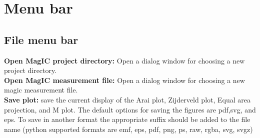 \documentclass[12pt]{article}
\begin{document}
\section{Menu bar}
\subsection{File menu bar}
{\bf Open MagIC project directory:} Open a dialog window for choosing a new project directory.\\
{\bf Open MagIC measurement file:} Open a dialog window for choosing a new magic measurement file.\\
{\bf Save plot:} save the current display of the Arai plot, Zijderveld plot, Equal area projection, and M plot. The default options for saving the figures are pdf,svg, and eps. To save in another format the appropriate suffix should be added to the file name (python supported formats are emf, eps, pdf, png, ps, raw, rgba, svg, svgz)\\
\end{document}
